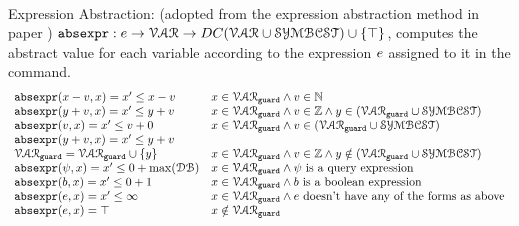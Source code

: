 \\
Expression Abstraction: (adopted from the expression abstraction method in paper \cite{sinn2017complexity})
$\mathtt{abs}{\mathtt{expr}} : e \to \mathcal{VAR} \to DC(\mathcal{VAR}  \cup \mathcal{SYMBCST}) \cup \{\top\} $,
computes the abstract value for each variable 
according to the expression $e$ assigned to it in the command.
  \[
    \begin{array}{ll} 
      \mathtt{abs}{\mathtt{expr}}(x - v, x)  = x' \leq x - v  & x \in \mathcal{VAR}_{\mathtt{guard}} \land v \in \mathbb{N} \\
      \mathtt{abs}{\mathtt{expr}}(y + v, x)  = x' \leq y + v  & x \in \mathcal{VAR}_{\mathtt{guard}} \land v \in \mathbb{Z} \land y \in (\mathcal{VAR}_{\mathtt{guard}} \cup \mathcal{SYMBCST}) \\
      \mathtt{abs}{\mathtt{expr}}(v, x)  = x' \leq v + 0  & x \in \mathcal{VAR}_{\mathtt{guard}} \land v \in (\mathcal{VAR}_{\mathtt{guard}} \cup \mathcal{SYMBCST}) \\
      \mathtt{abs}{\mathtt{expr}}(y + v, x)  = x' \leq y + v & \\
      \mathcal{VAR}_{\mathtt{guard}} = \mathcal{VAR}_{\mathtt{guard}} \cup \{y\} & x \in \mathcal{VAR}_{\mathtt{guard}} \land v \in \mathbb{Z} \land y \notin (\mathcal{VAR}_{\mathtt{guard}} \cup \mathcal{SYMBCST})  \\
      \mathtt{abs}{\mathtt{expr}}(\psi, x)  = x' \leq 0 + \max(\mathcal{DB}) & x \in \mathcal{VAR}_{\mathtt{guard}} \land \psi \text{ is a query expression}  \\
      \mathtt{abs}{\mathtt{expr}}(b, x) = x' \leq 0 + 1   & x \in \mathcal{VAR}_{\mathtt{guard}} \land b \text{ is a boolean expression} \\
      \mathtt{abs}{\mathtt{expr}}(e, x) = x' \leq \infty  &  x \in \mathcal{VAR}_{\mathtt{guard}} \land e \text{ doesn't have any of the forms as above} \\
      \mathtt{abs}{\mathtt{expr}}(e, x) = \top  &  x \notin \mathcal{VAR}_{\mathtt{guard}} \\
    \end{array}
    \]
